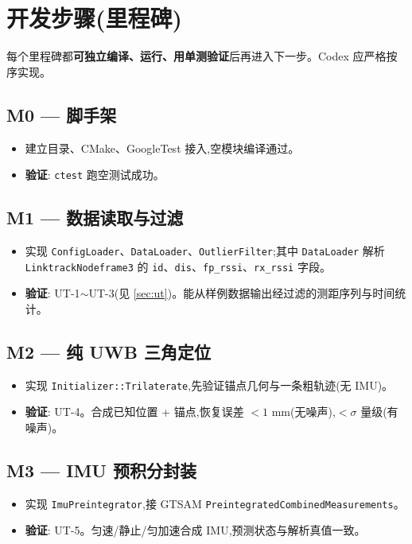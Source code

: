\documentclass[11pt,a4paper]{report}
\begin{document}
\chapter{开发步骤(里程碑)}

每个里程碑都\textbf{可独立编译、运行、用单测验证}后再进入下一步。Codex 应严格按序实现。

\section*{M0 — 脚手架}
\begin{itemize}[leftmargin=2em]
  \item 建立目录、CMake、GoogleTest 接入,空模块编译通过。
  \item \textbf{验证}: \texttt{ctest} 跑空测试成功。
\end{itemize}

\section*{M1 — 数据读取与过滤}
\begin{itemize}[leftmargin=2em]
  \item 实现 \texttt{ConfigLoader}、\texttt{DataLoader}、\texttt{OutlierFilter};其中 \texttt{DataLoader} 解析 \texttt{LinktrackNodeframe3} 的 \texttt{id}、\texttt{dis}、\texttt{fp\_rssi}、\texttt{rx\_rssi} 字段。
  \item \textbf{验证}: UT-1$\sim$UT-3(见 \ref{sec:ut})。能从样例数据输出经过滤的测距序列与时间统计。
\end{itemize}

\section*{M2 — 纯 UWB 三角定位}
\begin{itemize}[leftmargin=2em]
  \item 实现 \texttt{Initializer::Trilaterate},先验证锚点几何与一条粗轨迹(无 IMU)。
  \item \textbf{验证}: UT-4。合成已知位置 + 锚点,恢复误差 $<1$ mm(无噪声),$<\sigma$ 量级(有噪声)。
\end{itemize}

\section*{M3 — IMU 预积分封装}
\begin{itemize}[leftmargin=2em]
  \item 实现 \texttt{ImuPreintegrator},接 GTSAM \texttt{PreintegratedCombinedMeasurements}。
  \item \textbf{验证}: UT-5。匀速/静止/匀加速合成 IMU,预测状态与解析真值一致。
\end{itemize}
\end{document}

